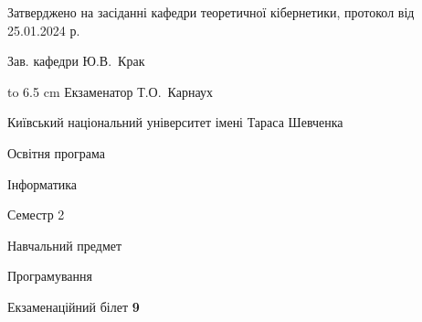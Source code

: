 \documentclass[12pt, ukrainian]{article}
\begin{document}
{\smallskip\smallskip \begin {scriptsize} Затверджено на засіданні кафедри теоретичної кібернетики, протокол   від   25.01.2024 р.\par\smallskip\smallskip\smallskip\smallskip
{\parbox {6.5 cm} {Зав. кафедри \dotfill Ю.В.~Крак}}\hspace {0.7cm} {\hbox to 6.5 cm { Екзаменатор \dotfill Т.О.~Карнаух}} \end{scriptsize}}
\newpage
{{\begin {scriptsize}\par
{ \center  Київський національний університет імені Тараса Шевченка \par}
{\parbox {5 cm}{Освітня програма \hfill}{\parbox {7 cm}{Інформатика\hfill}}\parbox {6 cm}{\hfill Семестр 2}}\par
{\parbox {5 cm} {Навчальний предмет \hfill}\parbox {7 cm}{Програмування \hfill}\parbox {6cm}{\hfill}\par}\vspace{-15pt} \end{scriptsize}}{\center Екзаменаційний білет \No \textbf { 9 }\par}}
\end{document}
